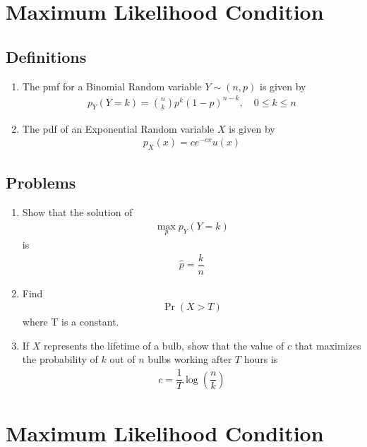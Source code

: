 \documentclass[journal,12pt,onecolumn]{IEEEtran}
\renewcommand\thesection{\arabic{section}}
\renewcommand\thesubsection{\thesection.\arabic{subsection}}
\providecommand{\pr}[1]{\ensuremath{\Pr\left(#1\right)}}
\providecommand{\brak}[1]{\ensuremath{\left(#1\right)}}
\theoremstyle{remark}
\numberwithin{equation}{section}
\begin{document}
 \section{Maximum Likelihood Condition}
 \subsection{Definitions}
\begin{enumerate}[label=\arabic*.,ref=\thesubsection.\theenumi]
\item The pmf for a Binomial Random variable  $ Y \sim \brak{n, p}$ is given by 
\begin{align}
 p_Y\brak{Y=k}  = \binom{n}{k}  p^k \brak{1-p}^{n-k}, \quad 0 \le k \le n
\end{align}
\item The pdf of an Exponential Random variable  $ X $ is given by
\begin{align}
 p_X\brak{x}  = ce^{-cx}u\brak{x}
\end{align}
\end{enumerate}
\subsection{Problems}
\begin{enumerate}[label=\arabic*.,ref=\thesubsection.\theenumi]
\item Show that  the solution of 
\begin{align}
 \max_{p} p_Y\brak{Y=k} 
\end{align} 
is 
		\begin{align}
			\hat{p} = \dfrac{k}{n} 
\end{align} 
\item  Find
\begin{align}
\pr{X > T} 
\end{align} 
		where T is a constant.
\item If $X$ represents the lifetime of a bulb,
	show that the value of $c$ that maximizes the probability of $k$ out of $n$ bulbs working after $T$ hours is
\begin{align}
c = \dfrac{1}{T}\log \brak{\dfrac{n}{k}}
\end{align}
 \end{enumerate}

 \section{Maximum Likelihood Condition}
\end{document}
